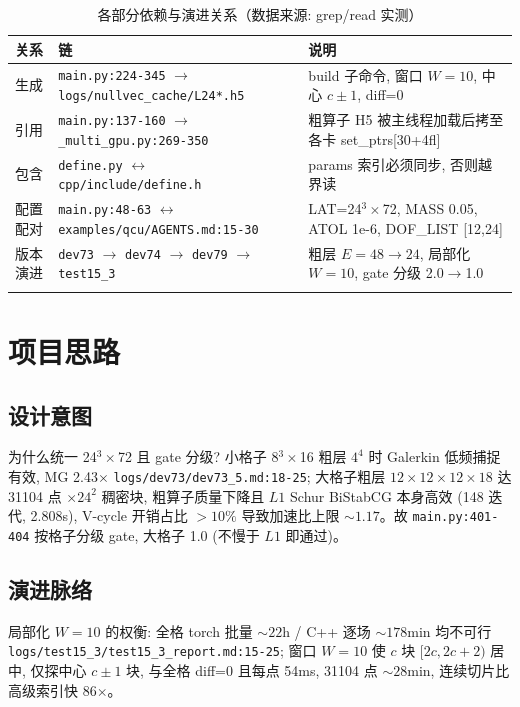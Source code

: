 \documentclass[UTF8]{ctexart}
\begin{document}
\begin{xltabular}{\textwidth}{llX}
\toprule
关系 & 链 & 说明 \\
\midrule
\endhead
生成 & \texttt{\nolinkurl{main.py:224-345}} $\to$ \texttt{\nolinkurl{logs/nullvec_cache/L24*.h5}} & build 子命令, 窗口 $W=10$, 中心 $c\pm1$, diff=0 \\
引用 & \texttt{\nolinkurl{main.py:137-160}} $\to$ \texttt{\nolinkurl{_multi_gpu.py:269-350}} & 粗算子 H5 被主线程加载后拷至各卡 set\_ptrs[30+4fl] \\
包含 & \texttt{\nolinkurl{define.py}} $\leftrightarrow$ \texttt{\nolinkurl{cpp/include/define.h}} & params 索引必须同步, 否则越界读 \\
配置配对 & \texttt{\nolinkurl{main.py:48-63}} $\leftrightarrow$ \texttt{\nolinkurl{examples/qcu/AGENTS.md:15-30}} & LAT=24$^3\times$72, MASS 0.05, ATOL 1e-6, DOF\_LIST [12,24] \\
版本演进 & \texttt{\nolinkurl{dev73}} $\to$ \texttt{\nolinkurl{dev74}} $\to$ \texttt{\nolinkurl{dev79}} $\to$ \texttt{\nolinkurl{test15_3}} & 粗层 $E=48\to24$, 局部化 $W=10$, gate 分级 2.0$\to$1.0 \\
\bottomrule
\caption{各部分依赖与演进关系（数据来源: grep/read 实测）}
\end{xltabular}

\section{项目思路}
\subsection{设计意图}
\textcolor{idea}{为什么统一 24$^3\times$72 且 gate 分级?} 小格子 8$^3\times$16 粗层 $4^4$ 时 Galerkin 低频捕捉有效, MG 2.43$\times$ \textcolor{evidence}{\texttt{\nolinkurl{logs/dev73/dev73_5.md:18-25}}}; 大格子粗层 $12\times12\times12\times18$ 达 31104 点 $\times 24^2$ 稠密块, 粗算子质量下降且 $L1$ Schur BiStabCG 本身高效 (148 迭代, 2.808s), V-cycle 开销占比 $>10\%$ 导致加速比上限 $\sim1.17$。故 \texttt{\nolinkurl{main.py:401-404}} 按格子分级 gate, 大格子 1.0 (不慢于 $L1$ 即通过)。

\subsection{演进脉络}
\textcolor{idea}{局部化 $W=10$ 的权衡:} 全格 torch 批量 $\sim22$h / C++ 逐场 $\sim178$min 均不可行 \textcolor{evidence}{\texttt{\nolinkurl{logs/test15_3/test15_3_report.md:15-25}}}; 窗口 $W=10$ 使 $c$ 块 $[2c,2c+2)$ 居中, 仅探中心 $c\pm1$ 块, 与全格 diff=0 且每点 54ms, 31104 点 $\sim28$min, 连续切片比高级索引快 86$\times$。
\end{document}
